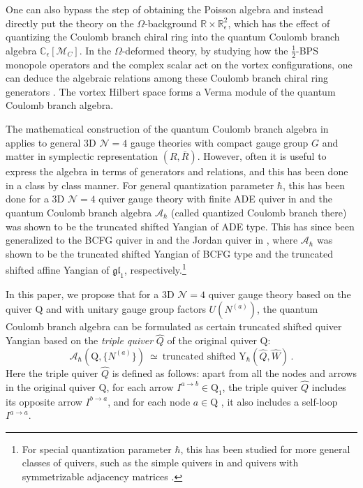 \documentclass[12pt,a4paper]{article}
\renewcommand{\(}{\left(}
\renewcommand{\)}{\right)}
\newcommand{\eps}{\epsilon}
\renewcommand{\(}{\left(}
\renewcommand{\)}{\right)}
\begin{document}
\medskip

One can also bypass the step of obtaining the Poisson algebra and instead directly put the theory on the $\Omega$-background $\mathbb{R}\times \mathbb{R}^2_{\eps}$, which has the effect of quantizing the Coulomb branch chiral ring into the  quantum Coulomb branch algebra $\mathbb{C}_\eps[\mathcal{M}_C]$.
In the $\Omega$-deformed theory, by studying how the $\frac{1}{2}$-BPS monopole operators and the complex scalar act on the vortex configurations, one can deduce the algebraic relations among these Coulomb branch chiral ring generators \cite{Bullimore:2016hdc}.
The vortex Hilbert space forms a Verma module of the quantum Coulomb branch algebra.

\medskip





The mathematical construction of the quantum Coulomb branch algebra in \cite{Braverman:2016pwk, Braverman:2016wma} applies to general 3D $\mathcal{N}=4$ gauge theories with compact gauge group $G$ and matter in symplectic representation $(R,\bar{R})$. 
However, often it is useful to express the algebra in terms of generators and relations, and this has been done in a class by class manner. 
For general quantization parameter $\hbar$,  this has been done for a 3D $\mathcal{N}=4$ quiver gauge theory with finite ADE quiver in \cite{Braverman:2016pwk} and the quantum Coulomb branch algebra $\mathcal{A}_{\hbar}$ (called quantized Coulomb branch there) was shown to be the truncated shifted Yangian of ADE type.
This has since been generalized to the BCFG quiver in \cite{Nakajima:2019olw} and the Jordan quiver in \cite{Kodera:2016faj_jordan_quiver}, where $\mathcal{A}_{\hbar}$ was shown to be the truncated shifted Yangian of BCFG type and the truncated shifted affine Yangian of $\mathfrak{gl}_1$, respectively.\footnote{
For special quantization parameter $\hbar$, this has been studied for more general classes of quivers, such as the simple quivers in \cite{Kamnitzer:2019mjs,weekes2019generatorscoulombbranchesquiver} and quivers with symmetrizable adjacency matrices  \cite{Nakajima:2019olw}.
}

\medskip



In this paper, we propose that for a 3D $\mathcal{N}=4$ quiver gauge theory based on the quiver $\mathrm{Q}$ and with unitary gauge group factors $U(N^{(a)})$, the quantum Coulomb branch algebra can be formulated as certain truncated shifted quiver Yangian 
based on the \textit{triple quiver} $\widehat{Q}$ of the original quiver $\mathrm{Q}$:
\begin{equation}\label{eq:MainConjecture}
\mathcal{A}_{\hbar}(\mathrm{Q},\{N^{(a)}\})
\ \simeq \
\textrm{truncated shifted }
\mathrm{Y}_{\hbar}(\widehat{Q},\widehat{W}) \,.
\end{equation}
Here the triple quiver $\widehat{Q}$ is defined as follows: apart from all the nodes and arrows in the original quiver $\mathrm{Q}$, for each arrow $I^{a\rightarrow b}\in \mathrm{Q}_1$, the triple quiver $\widehat{Q}$ includes its opposite arrow $I^{b \rightarrow a}$, and for each node $a\in \mathrm{Q}$ , it also includes a self-loop $I^{a \rightarrow a}$.
\end{document}
